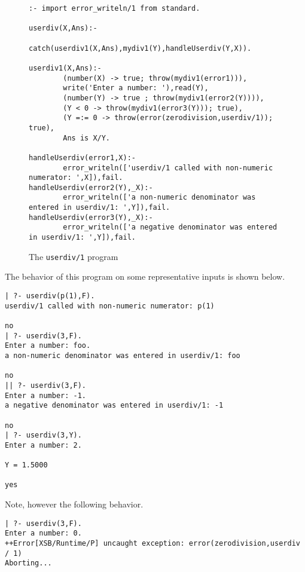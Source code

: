 \begin{figure}[hbtp]
\longline
\begin{small}
\begin{verbatim}
:- import error_writeln/1 from standard.

userdiv(X,Ans):- 
        catch(userdiv1(X,Ans),mydiv1(Y),handleUserdiv(Y,X)).

userdiv1(X,Ans):- 
        (number(X) -> true; throw(mydiv1(error1))),
        write('Enter a number: '),read(Y),
        (number(Y) -> true ; throw(mydiv1(error2(Y)))),
        (Y < 0 -> throw(mydiv1(error3(Y))); true),
        (Y =:= 0 -> throw(error(zerodivision,userdiv/1)); true),
        Ans is X/Y.

handleUserdiv(error1,X):- 
        error_writeln(['userdiv/1 called with non-numeric numerator: ',X]),fail.
handleUserdiv(error2(Y),_X):- 
        error_writeln(['a non-numeric denominator was entered in userdiv/1: ',Y]),fail.
handleUserdiv(error3(Y),_X):- 
        error_writeln(['a negative denominator was entered in userdiv/1: ',Y]),fail.
\end{verbatim}
\end{small}
\caption{The {\tt userdiv/1} program} \label{fig:userdiv}
\longline
\end{figure}

The behavior of this program on some representative inputs is shown
below.

\begin{small}
\begin{verbatim}
| ?- userdiv(p(1),F).
userdiv/1 called with non-numeric numerator: p(1)

no
| ?- userdiv(3,F).
Enter a number: foo.
a non-numeric denominator was entered in userdiv/1: foo

no
|| ?- userdiv(3,F).
Enter a number: -1.
a negative denominator was entered in userdiv/1: -1

no
| ?- userdiv(3,Y).
Enter a number: 2.

Y = 1.5000

yes
\end{verbatim}
\end{small}

\noindent
Note, however the following behavior.

\begin{small}
\begin{verbatim}
| ?- userdiv(3,F).
Enter a number: 0.
++Error[XSB/Runtime/P] uncaught exception: error(zerodivision,userdiv / 1)
Aborting...
\end{verbatim}
\end{small}

